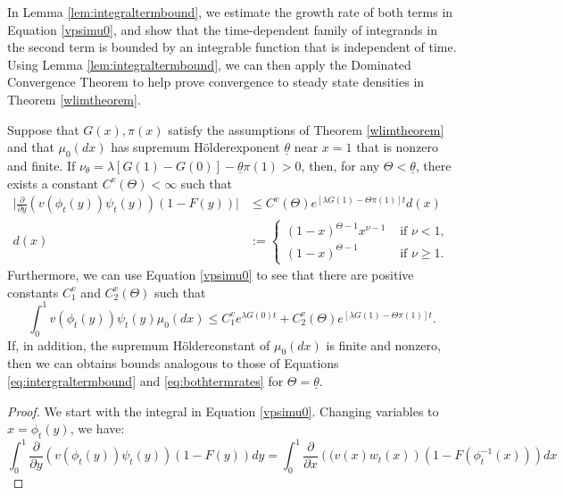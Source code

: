 \documentclass[11pt]{article}
\numberwithin{equation}{section}
\newcommand{\holder}{H{\"o}lder\:}
\newcommand{\paren}[1]{\left(#1\right)}
\newcommand{\PD}[2]{\frac{\partial#1}{\partial#2}}
\begin{document}
{In Lemma \ref{lem:integraltermbound}, we estimate the growth rate of both terms in Equation \eqref{vpsimu0}, and show that the time-dependent family of integrands in the second term is bounded by an integrable function that is independent of time. Using Lemma \ref{lem:integraltermbound}, we can then apply the Dominated Convergence Theorem to help prove convergence to steady state densities in Theorem \ref{wlimtheorem}. 
\begin{lemma} \label{lem:integraltermbound}
Suppose that $G(x), \pi(x)$ satisfy the assumptions of Theorem \ref{wlimtheorem} and that $\mu_0(dx)$ has supremum \holder exponent $\underline{\theta}$ near $x=1$ that is nonzero and finite. If $\nu_{\theta}= \lambda \left[G(1) - G(0)\right] - \underline{\theta} \pi(1) > 0$, then, for any $\Theta < \underline{\theta}$, there exists a constant $C^v(\Theta) < \infty$ such that
\begin{equation} \label{eq:intergraltermbound} \begin{aligned}
    \bigg| \PD{}{y}\paren{v(\phi_t(y))\psi_t(y)}(1-F(y)) \bigg| &\leq C^v(\Theta) e^{\left[\lambda G(1) - \Theta \pi(1)\right] t} d(x)  \\ d(x) &:=  \begin{cases}
(1-x)^{\Theta-1}x^{\nu-1} &\text{ if } \nu<1,\\
(1-x)^{\Theta-1} &\text{ if } \nu\geq 1.
\end{cases} 
\end{aligned}
\end{equation}
Furthermore, we can use Equation \eqref{vpsimu0} to see that there are positive constants $C_1^v$ and $C_2^v(\Theta)$ such that 
\begin{equation} \label{eq:bothtermrates}
 \int_0^1 v(\phi_t(y))\psi_t(y)\mu_0(dx) \leq C_1^v e^{\lambda G(0) t} + C_2^v(\Theta) e^{\left[\lambda G(1) - \Theta \pi(1) \right] t}.  
\end{equation}
If, in addition, the supremum \holder constant of $\mu_0(dx)$ is finite and nonzero, then we can obtains bounds analogous to those of Equations \eqref{eq:intergraltermbound} and \eqref{eq:bothtermrates} for $\Theta = \underline{\theta}$. 
\end{lemma}
\begin{proof}
 We start with the integral in Equation \eqref{vpsimu0}.
Changing variables to $x=\phi_t(y)$, we have:
\begin{equation}
\int_0^1\PD{}{y}\paren{v(\phi_t(y))\psi_t(y)}(1-F(y))dy
=\int_0^1 \PD{}{x}\paren{(v(x)w_t(x)}(1-F(\phi_t^{-1}(x)))dx
\end{equation}

\end{proof}}
\end{document}
